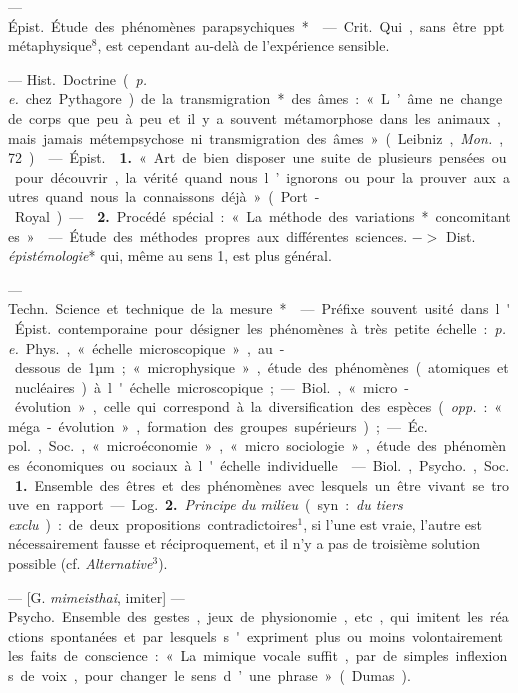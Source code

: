 \begin{itemize}[leftmargin=1cm, label=, itemsep=1pt]
 — \si{Épist.} Étude des phénomènes parapsychiques*.

 — \si{Crit.} Qui, sans être ppt. métaphysique$^8$, est
cependant au-delà de l'expérience sensible.

 — \si{Hist.} Doctrine ({\it p. e.} chez Pythagore) de la
transmigration* des âmes : « L’âme ne change de corps que peu à peu. et il y
a souvent métamorphose dans les animaux, mais jamais métempsychose ni
transmigration des âmes » (Leibniz, {\it Mon.}, 72).

 — \si{Épist.}  {\bf 1.} « Art de bien disposer
une suite de plusieurs pensées ou pour découvrir, la vérité
quand nous l’ignorons ou pour la prouver aux autres quand nous la connaissons
déjà » (Port-Royal). —  {\bf 2.} Procédé spécial : « La
méthode des variations* concomitantes ».

 — Étude des méthodes propres aux différentes sciences. $->$
Dist. {\it épistémologie}* qui, même au sens 1, est plus général.

 — \si{Techn.} Science et technique de la mesure*.

 — Préfixe souvent usité dans l'\si{Épist.} contemporaine pour
désigner les phénomènes à très petite échelle : {\it p. e.} \si{Phys.},
« échelle microscopique », au-dessous de 1µm ; « microphysique », étude des
phénomènes (atomiques et nucléaires) à l'échelle microscopique; — \si{Biol.},
« micro-évolution », celle qui correspond à la diversification des espèces
({\it opp.} : « méga-évolution », formation des groupes supérieurs) ; —
\si{Éc. pol.}, \si{Soc.}, « microéconomie », « micro sociologie », étude des
phénomènes économiques ou sociaux à l'échelle individuelle.

 — \si{Biol.}, \si{Psycho.}, \si{Soc.} {\bf 1.} Ensemble des êtres
et des phénomènes avec lesquels un être vivant se trouve en rapport.

— \si{Log.} {\bf 2.} {\it Principe du milieu} (syn. : {\it du tiers exclu}) :
de deux propositions contradictoires$^1$, si l’une est vraie, l’autre est
nécessairement fausse et réciproquement, et il n’y a pas de troisième
solution possible (cf. {\it Alternative}$^3$).

 — [G. {\it mimeisthai}, imiter] — \si{Psycho.} Ensemble des
gestes, jeux de physionomie, etc, qui imitent les réactions spontanées et par
lesquels s'expriment plus ou moins volontairement les faits de conscience :
« La mimique vocale suffit, par de simples inflexions de voix, pour changer
le sens d’une phrase » (Dumas).


\end{itemize}
